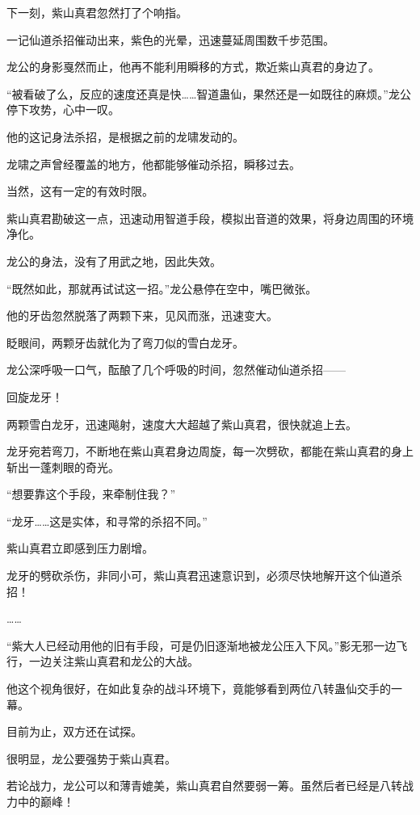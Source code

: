
\begin{this_body}

下一刻，紫山真君忽然打了个响指。

一记仙道杀招催动出来，紫色的光晕，迅速蔓延周围数千步范围。

龙公的身影戛然而止，他再不能利用瞬移的方式，欺近紫山真君的身边了。

“被看破了么，反应的速度还真是快……智道蛊仙，果然还是一如既往的麻烦。”龙公停下攻势，心中一叹。

他的这记身法杀招，是根据之前的龙啸发动的。

龙啸之声曾经覆盖的地方，他都能够催动杀招，瞬移过去。

当然，这有一定的有效时限。

紫山真君勘破这一点，迅速动用智道手段，模拟出音道的效果，将身边周围的环境净化。

龙公的身法，没有了用武之地，因此失效。

“既然如此，那就再试试这一招。”龙公悬停在空中，嘴巴微张。

他的牙齿忽然脱落了两颗下来，见风而涨，迅速变大。

眨眼间，两颗牙齿就化为了弯刀似的雪白龙牙。

龙公深呼吸一口气，酝酿了几个呼吸的时间，忽然催动仙道杀招——

回旋龙牙！

两颗雪白龙牙，迅速飚射，速度大大超越了紫山真君，很快就追上去。

龙牙宛若弯刀，不断地在紫山真君身边周旋，每一次劈砍，都能在紫山真君的身上斩出一蓬刺眼的奇光。

“想要靠这个手段，来牵制住我？”

“龙牙……这是实体，和寻常的杀招不同。”

紫山真君立即感到压力剧增。

龙牙的劈砍杀伤，非同小可，紫山真君迅速意识到，必须尽快地解开这个仙道杀招！

……

“紫大人已经动用他的旧有手段，可是仍旧逐渐地被龙公压入下风。”影无邪一边飞行，一边关注紫山真君和龙公的大战。

他这个视角很好，在如此复杂的战斗环境下，竟能够看到两位八转蛊仙交手的一幕。

目前为止，双方还在试探。

很明显，龙公要强势于紫山真君。

若论战力，龙公可以和薄青媲美，紫山真君自然要弱一筹。虽然后者已经是八转战力中的巅峰！


\end{this_body}
